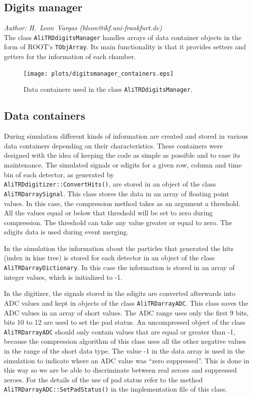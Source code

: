 \documentclass{alicetdr}
\begin{document}
\subsection{Digits manager}
\label{DIGITS:manager}
%
{\it Author: H.~Leon~Vargas (hleon@ikf.uni-frankfurt.de)}
\smallskip
\\
%
The class {\tt AliTRDdigitsManager} handles arrays of data container
objects in the form of ROOT's {\tt TObjArray}.  Its main functionality
is that it provides setters and getters for the information of each chamber.
%
\begin{figure}[htb]
\begin{center}
\texttt{[image: plots/digitsmanager\_containers.eps]}
\end{center}
\caption{
Data containers used in the class {\tt AliTRDdigitsManager}.
}
\label{FIG_DIG:manager}
\end{figure}
%
\subsection{Data containers}
\label{DIGITS:containers}
%
During simulation different kinds of information are created and stored
in various data containers depending on their characteristics.
These containers were designed with the idea of keeping the code as
simple as possible and to ease its maintenance.
The simulated signals or sdigits for a given row, column and time bin
of each detector, as generated by \\ {\tt AliTRDdigitizer::ConvertHits()},
are stored in an object of the class {\tt AliTRDarraySignal}.   This
class stores the data in an array of floating point values.  In this
case, the compression method takes as an argument a threshold.  All the
values equal or below that threshold will be set to zero during
compression. The threshold can take any value greater or equal to zero.
The sdigits data is used during event merging.

In the simulation the information about the particles that generated the
hits (index in kine tree) is stored for each detector in an object
of the class {\tt AliTRDarrayDictionary}. In this case the information
is stored in an array of integer values, which is initialized to -1.

In the digitizer, the signals stored in the sdigits are converted
afterwards into ADC values and kept in objects of the class
{\tt AliTRDarrayADC}.  This class saves the ADC values in an array of
short values. The ADC range uses only the first 9 bits, bits 10 to 12
are used to set the pad status.  An uncompressed object of the class
{\tt AliTRDarrayADC} should only contain values that are equal or
greater than -1, because the compression algorithm of this class uses
all the other negative values in the range of the short data type. The
value -1 in the data array is used in the simulation to indicate where
an ADC value was ``zero suppressed''. This is done in this way so we
are be able to discriminate between real zeroes and suppressed zeroes.
For the details of the use of pad status refer to the method
{\tt AliTRDarrayADC::SetPadStatus()} in the implementation file of this class.
%
\end{document}
